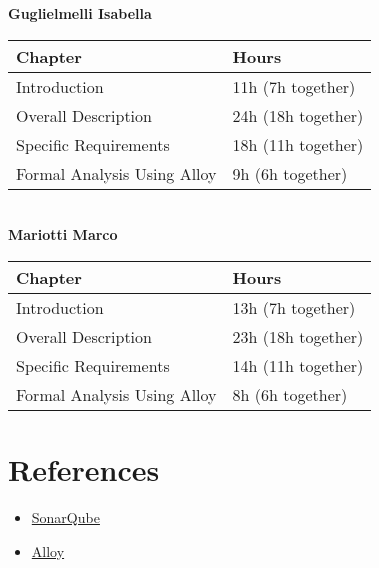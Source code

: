 \documentclass[a4paper, 11pt, titlepage]{article}
\begin{document}
\textbf{Guglielmelli Isabella}

\begin{tabular}{|l|l|} 
    \hline
    \textbf{Chapter}            & \textbf{Hours}  \\ 
    \hline
    Introduction                & 11h (7h together)             \\ 
    \hline
    Overall Description         & 24h (18h together)          \\ 
    \hline
    Specific Requirements       & 18h (11h together)              \\ 
    \hline
    Formal Analysis Using Alloy & 9h (6h together)               \\ 
    \hline
\end{tabular}\\

\textbf{Mariotti Marco}

\begin{tabular}{|l|l|} 
    \hline
    \textbf{Chapter}            & \textbf{Hours}  \\ 
    \hline
    Introduction                & 13h (7h together)              \\ 
    \hline
    Overall Description         & 23h (18h together)           \\ 
    \hline
    Specific Requirements       & 14h (11h together)              \\ 
    \hline
    Formal Analysis Using Alloy & 8h (6h together)              \\
    \hline
\end{tabular}


\section{References}
\begin{itemize}
    \item \href{https://www.sonarsource.com/products/sonarqube/}{SonarQube}
    \item \href{https://alloytools.org/}{Alloy}
\end{itemize}
\end{document}
